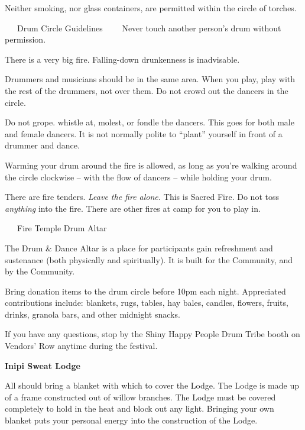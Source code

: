 \documentclass[9pt,twoside,openright,final,article]{memoir}
\renewcommand{\subsection}[1]{%
  \vspace{6pt}%
  \needspace{1.25in}%
  \begin{center}\textbf{\Large \beltanefamily #1}\end{center}

  \nopagebreak}
\renewcommand{\subsubsection}[1]{%
  \vspace{1pt}\needspace{1.5in}
  {\large ~~~\beltanefamily #1~~~\ }
  \nopagebreak}
\begin{document}
\begin{multicols}{2}
  Neither smoking, nor glass containers, are permitted within the
  circle of torches.


  \subsubsection{Drum Circle Guidelines}
  Never touch another person's drum without permission.

  There is a very big fire. Falling-down drunkenness is inadvisable.

  Drummers and musicians should be in the same area. When you play,
  play with the rest of the drummers, not over them. Do not crowd out
  the dancers in the circle.

  Do not grope. whistle at, molest, or fondle the dancers. This goes
  for both male and female dancers.  It is not normally polite to
  ``plant'' yourself in front of a drummer and dance.

  Warming your drum around the fire is allowed, as long as you're
  walking around the circle clockwise -- with the flow of dancers --
  while holding your drum.

  There are fire tenders.  \emph{Leave the fire alone.}  This is
  Sacred Fire. Do not toss \emph{anything} into the fire. There are
  other fires at camp for you to play in.

  \subsubsection{Fire Temple Drum Altar}

  The Drum \& Dance Altar is a place for participants gain refreshment
  and sustenance (both physically and spiritually). It is built for
  the Community, and by the Community.

  Bring donation items to the drum circle before 10pm each night.
  Appreciated contributions include: blankets, rugs, tables, hay
  bales, candles, flowers, fruits, drinks, granola bars, and other
  midnight snacks.

  If you have any questions, stop by the Shiny Happy People Drum Tribe
  booth on Vendors' Row anytime during the festival.



  \subsection{Inipi Sweat Lodge} \label{sweatlodge}

  All should bring a blanket with which to cover the Lodge. The Lodge
  is made up of a frame constructed out of willow branches. The Lodge
  must be covered completely to hold in the heat and block out any
  light. Bringing your own blanket puts your personal energy into the
  construction of the Lodge.


\end{multicols}
\end{document}
